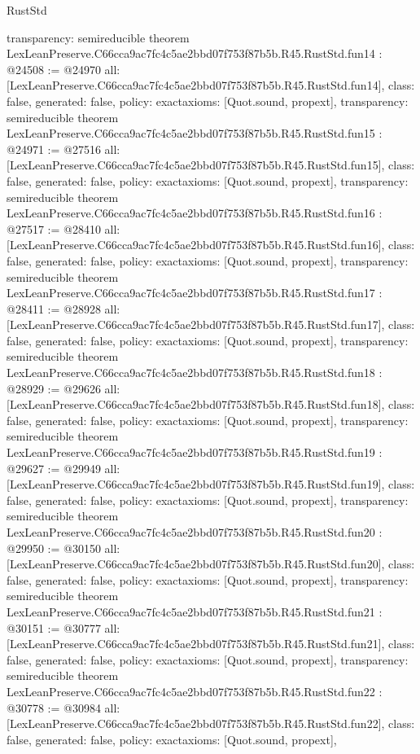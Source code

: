 \begin{lexlean}{RustStd}
\begin{coremodule}
{  transparency: semireducible
}
theorem LexLeanPreserve.C66cca9ac7fc4c5ae2bbd07f753f87b5b.R45.RustStd.fun14 : @24508 := @24970 {
  all: [LexLeanPreserve.C66cca9ac7fc4c5ae2bbd07f753f87b5b.R45.RustStd.fun14],
  class: false,
  generated: false,
  policy: exact{axioms: [Quot.sound, propext]},
  transparency: semireducible
}
theorem LexLeanPreserve.C66cca9ac7fc4c5ae2bbd07f753f87b5b.R45.RustStd.fun15 : @24971 := @27516 {
  all: [LexLeanPreserve.C66cca9ac7fc4c5ae2bbd07f753f87b5b.R45.RustStd.fun15],
  class: false,
  generated: false,
  policy: exact{axioms: [Quot.sound, propext]},
  transparency: semireducible
}
theorem LexLeanPreserve.C66cca9ac7fc4c5ae2bbd07f753f87b5b.R45.RustStd.fun16 : @27517 := @28410 {
  all: [LexLeanPreserve.C66cca9ac7fc4c5ae2bbd07f753f87b5b.R45.RustStd.fun16],
  class: false,
  generated: false,
  policy: exact{axioms: [Quot.sound, propext]},
  transparency: semireducible
}
theorem LexLeanPreserve.C66cca9ac7fc4c5ae2bbd07f753f87b5b.R45.RustStd.fun17 : @28411 := @28928 {
  all: [LexLeanPreserve.C66cca9ac7fc4c5ae2bbd07f753f87b5b.R45.RustStd.fun17],
  class: false,
  generated: false,
  policy: exact{axioms: [Quot.sound, propext]},
  transparency: semireducible
}
theorem LexLeanPreserve.C66cca9ac7fc4c5ae2bbd07f753f87b5b.R45.RustStd.fun18 : @28929 := @29626 {
  all: [LexLeanPreserve.C66cca9ac7fc4c5ae2bbd07f753f87b5b.R45.RustStd.fun18],
  class: false,
  generated: false,
  policy: exact{axioms: [Quot.sound, propext]},
  transparency: semireducible
}
theorem LexLeanPreserve.C66cca9ac7fc4c5ae2bbd07f753f87b5b.R45.RustStd.fun19 : @29627 := @29949 {
  all: [LexLeanPreserve.C66cca9ac7fc4c5ae2bbd07f753f87b5b.R45.RustStd.fun19],
  class: false,
  generated: false,
  policy: exact{axioms: [Quot.sound, propext]},
  transparency: semireducible
}
theorem LexLeanPreserve.C66cca9ac7fc4c5ae2bbd07f753f87b5b.R45.RustStd.fun20 : @29950 := @30150 {
  all: [LexLeanPreserve.C66cca9ac7fc4c5ae2bbd07f753f87b5b.R45.RustStd.fun20],
  class: false,
  generated: false,
  policy: exact{axioms: [Quot.sound, propext]},
  transparency: semireducible
}
theorem LexLeanPreserve.C66cca9ac7fc4c5ae2bbd07f753f87b5b.R45.RustStd.fun21 : @30151 := @30777 {
  all: [LexLeanPreserve.C66cca9ac7fc4c5ae2bbd07f753f87b5b.R45.RustStd.fun21],
  class: false,
  generated: false,
  policy: exact{axioms: [Quot.sound, propext]},
  transparency: semireducible
}
theorem LexLeanPreserve.C66cca9ac7fc4c5ae2bbd07f753f87b5b.R45.RustStd.fun22 : @30778 := @30984 {
  all: [LexLeanPreserve.C66cca9ac7fc4c5ae2bbd07f753f87b5b.R45.RustStd.fun22],
  class: false,
  generated: false,
  policy: exact{axioms: [Quot.sound, propext]},
}
\end{coremodule}
\end{lexlean}
